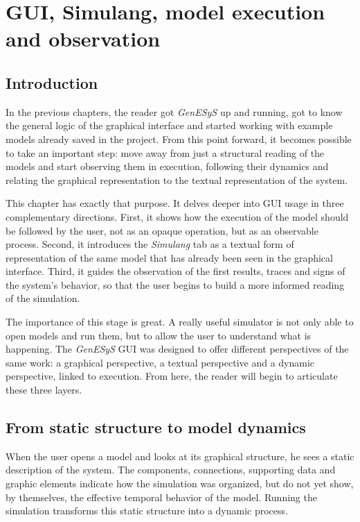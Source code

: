 \chapter{GUI, Simulang, model execution and observation}
\label{chap:gui_simulang_execucao_observacao}

\section{Introduction}
\label{sec:cap5_introducao}

In the previous chapters, the reader got \textit{GenESyS} up and running, got to know the general logic of the graphical interface and started working with example models already saved in the project. From this point forward, it becomes possible to take an important step: move away from just a structural reading of the models and start observing them in execution, following their dynamics and relating the graphical representation to the textual representation of the system.

This chapter has exactly that purpose. It delves deeper into GUI usage in three complementary directions. First, it shows how the execution of the model should be followed by the user, not as an opaque operation, but as an observable process. Second, it introduces the \textit{Simulang} tab as a textual form of representation of the same model that has already been seen in the graphical interface. Third, it guides the observation of the first results, traces and signs of the system's behavior, so that the user begins to build a more informed reading of the simulation.

The importance of this stage is great. A really useful simulator is not only able to open models and run them, but to allow the user to understand what is happening. The \textit{GenESyS} GUI was designed to offer different perspectives of the same work: a graphical perspective, a textual perspective and a dynamic perspective, linked to execution. From here, the reader will begin to articulate these three layers.

\section{From static structure to model dynamics}
\label{sec:cap5_estrutura_estatica_dinamica}

When the user opens a model and looks at its graphical structure, he sees a static description of the system. The components, connections, supporting data and graphic elements indicate how the simulation was organized, but do not yet show, by themselves, the effective temporal behavior of the model. Running the simulation transforms this static structure into a dynamic process.

